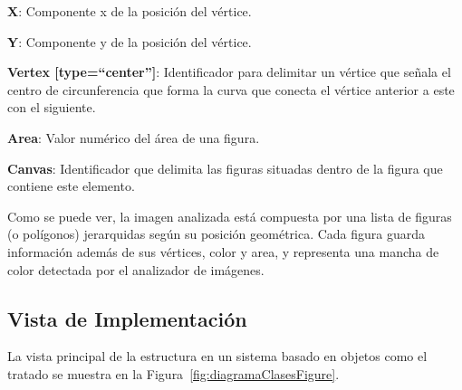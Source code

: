 \begin{longenum}
\begin{longenum}
\begin{longenum}
\begin{longenum}
\begin{longenum}
						\item \textbf{X}: Componente x de la posición del vértice.
						\item \textbf{Y}: Componente y de la posición del vértice.
						\end{longenum}
					\item \textbf{Vertex [type=``center'']}: Identificador para delimitar un vértice que señala el centro de circunferencia que forma la curva que conecta el vértice anterior a este con el siguiente.
				\end{longenum}
			\end{longenum}
		\end{longenum}
		\item \textbf{Area}: Valor numérico del área de una figura.
		\item \textbf{Canvas}: Identificador que delimita las figuras situadas dentro de la figura que contiene este elemento. 
	\end{longenum}
	
	Como se puede ver, la imagen analizada está compuesta por una lista de figuras (o polígonos) jerarquidas según su posición geométrica. Cada figura guarda información además de sus vértices, color y area, y representa una mancha de color detectada por el analizador de imágenes.


\subsection{Vista de Implementación}

	La vista principal de la estructura en un sistema basado en objetos como el tratado se muestra en la Figura~\ref{fig:diagramaClasesFigure}.\\

